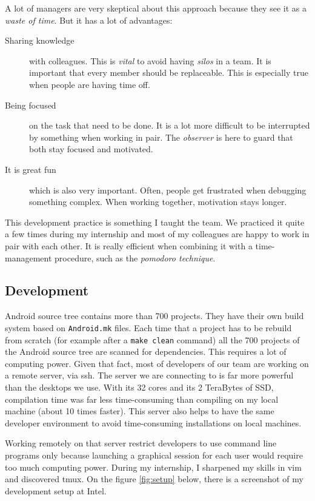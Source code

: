 A lot of managers are very skeptical about this approach because they see it as a \emph{waste of time}.
But it has a lot of advantages:
\begin{description}
    \item[Sharing knowledge] with colleagues. This is \emph{vital} to avoid having \emph{silos} in a team. It is important
        that every member should be replaceable. This is especially true when people are having time off.
    \item[Being focused] on the task that need to be done. It is a lot more difficult to be interrupted by something when working
        in pair. The \emph{observer} is here to guard that both stay focused and motivated.
    \item[It is great fun] which is also very important. Often, people get frustrated when debugging something complex.
        When working together, motivation stays longer.
\end{description}
This development practice is something I taught the team. We practiced it quite a few times during my internship and most of
my colleagues are happy to work in pair with each other.
It is really efficient when combining it with a time-management procedure,
such as the \emph{pomodoro technique}.

\subsection{Development}
Android source tree contains more than 700 projects. They have their own build system
based on \lstinline{Android.mk} files. Each time that a project has to be rebuild from scratch (for example after a  \lstinline{make clean} command) all
the 700 projects of the Android source tree are scanned for dependencies. This requires a lot of computing power.
Given that fact, most of developers of our team are working on a remote server, via ssh.
The server we are connecting to is far more powerful than the desktops we use.
With its 32 cores and its 2 TeraBytes of SSD, compilation time was far less time-consuming
than compiling on my local machine (about 10 times faster).
This server also helps to have the same developer environment to avoid
time-consuming installations on local machines.

Working remotely on that server restrict developers to use command line programs only because
launching a graphical session for each user would require too much computing power.
During my internship, I sharpened my skills in \gls{vim} and discovered \gls{tmux}.
On the figure \ref{fig:setup} below, there is a screenshot of my development setup at Intel.

